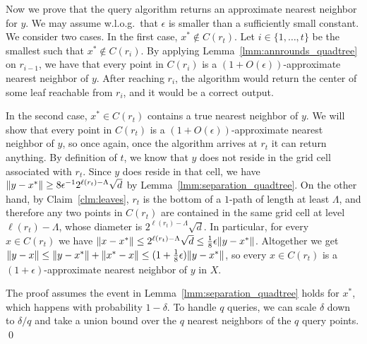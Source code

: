 Now we prove that the query algorithm returns an approximate nearest neighbor for $y$.
We may assume w.l.o.g.~that $\epsilon$ is smaller than a sufficiently small constant.
We consider two cases. In the first case, $x^*\notin C(r_t)$.
Let $i\in\{1,\ldots,t\}$ be the smallest such that $x^*\notin C(r_i)$.
By applying Lemma~\ref{lmm:annrounds_quadtree} on $r_{i-1}$, we have that every point in $C(r_i)$ is a $(1+O(\epsilon))$-approximate nearest neighbor of $y$. After reaching $r_i$, the algorithm would return the center of some leaf reachable from $r_i$, and it would be a correct output.

In the second case, $x^*\in C(r_t)$ contains a true nearest neighbor of $y$. We will show that every point in $C(r_t)$ is a $(1+O(\epsilon))$-approximate nearest neighbor of $y$, so once again, once the algorithm arrives at $r_t$ it can return anything.
By definition of $t$, we know that $y$ does not reside in the grid cell associated with $r_t$. Since $y$ does reside in that cell, we have $\lVert y-x^*\rVert\geq8\epsilon^{-1}2^{\ell(r_t)-\Lambda}\sqrt{d}$ by Lemma~\ref{lmm:separation_quadtree}. On the other hand, by Claim~\ref{clm:leaves}, $r_t$ is the bottom of a $1$-path of length at least $\Lambda$, and therefore any two points in $C(r_t)$ are contained in the same grid cell at level $\ell(r_t)-\Lambda$, whose diameter is $2^{\ell(r_t)-\Lambda}\sqrt{d}$. In particular, for every $x\in C(r_t)$ we have $\lVert x-x^*\rVert\leq2^{\ell(r_t)-\Lambda}\sqrt{d}\leq\frac{1}{8}\epsilon\lVert y-x^*\rVert$. Altogether we get $\lVert y-x\rVert \leq \lVert y-x^*\rVert + \lVert x^*-x\rVert \leq (1+\frac{1}{8}\epsilon)\lVert y-x^*\rVert$, so every $x\in C(r_t)$ is a $(1+\epsilon)$-approximate nearest neighbor of $y$ in $X$.

The proof assumes the event in Lemma~\ref{lmm:separation_quadtree} holds for $x^*$, which happens with probability $1-\delta$. To handle $q$ queries, we can scale $\delta$ down to $\delta/q$ and take a union bound over the $q$ nearest neighbors of the $q$ query points. \qed
